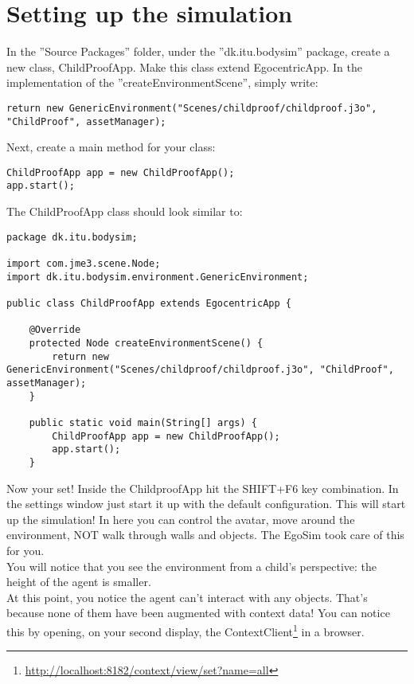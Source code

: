 \section{Setting up the simulation} %
\label{sec:sd_setup_simulation}
In the ''Source Packages'' folder, under the ''dk.itu.bodysim'' package, create a new class, ChildProofApp. Make this class extend EgocentricApp. In the implementation of the ''createEnvironmentScene'', simply write:
\begin{lstlisting}
return new GenericEnvironment("Scenes/childproof/childproof.j3o", "ChildProof", assetManager);
\end{lstlisting}

Next, create a main method for your class:
\begin{lstlisting}
ChildProofApp app = new ChildProofApp(); 
app.start();
\end{lstlisting}

The ChildProofApp class should look similar to:
\begin{lstlisting}
package dk.itu.bodysim;

import com.jme3.scene.Node;
import dk.itu.bodysim.environment.GenericEnvironment;

public class ChildProofApp extends EgocentricApp {

    @Override
    protected Node createEnvironmentScene() {
        return new GenericEnvironment("Scenes/childproof/childproof.j3o", "ChildProof", assetManager);
    }

    public static void main(String[] args) {
        ChildProofApp app = new ChildProofApp();
        app.start();
    }
\end{lstlisting}

Now your set! Inside the ChildproofApp hit the SHIFT+F6 key combination. In the settings window just start it up with the default configuration. This will start up the simulation! In here you can control the avatar, move around the environment, NOT walk through walls and objects. The EgoSim took care of this for you.\\

You will notice that you see the environment from a child's perspective: the height of the agent is smaller.\\

At this point, you notice the agent can't interact with any objects. That's because none of them have been augmented with context data! You can notice this by opening, on your second display, the ContextClient\footnote{\url{http://localhost:8182/context/view/set?name=all}} in a browser.

